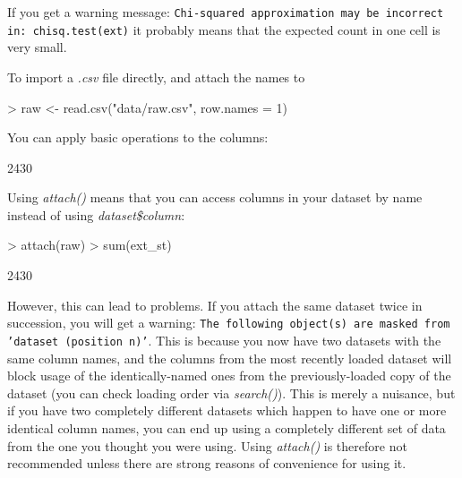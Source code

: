\documentclass[a4paper,10pt]{article}
\begin{document}
If you get a warning message:
\texttt{Chi-squared approximation may be incorrect in: chisq.test(ext)}
it probably means that the expected count in one cell is very small. 











To import a \textit{.csv} file directly, and attach the names to 
\begin{Schunk}
\begin{Sinput}
> raw <- read.csv("data/raw.csv", row.names = 1)
\end{Sinput}
\end{Schunk}


You can apply basic operations to the columns:
\begin{Schunk}
\begin{Soutput}
[1] 2430
\end{Soutput}
\end{Schunk}


Using \textit{attach()} means that you can access columns in your dataset by name instead of using \textit{dataset\$column}:
\begin{Schunk}
\begin{Sinput}
> attach(raw)
> sum(ext_st)
\end{Sinput}
\begin{Soutput}
[1] 2430
\end{Soutput}
\end{Schunk}

However, this can lead to problems.  If you attach the same dataset twice in succession, you will get a warning: \texttt{The following object(s) are masked from 'dataset (position n)'}.  This is because you now have two datasets with the same column names, and the columns from the most recently loaded dataset will block usage of the identically-named ones from the previously-loaded copy of the dataset (you can check loading order via \textit{search()}).  This is merely a nuisance, but if you have two completely different datasets which happen to have one or more identical column names, you can end up using a completely different set of data from the one you thought you were using.  Using \textit{attach()} is therefore not recommended unless there are strong reasons of convenience for using it.
\end{document}
